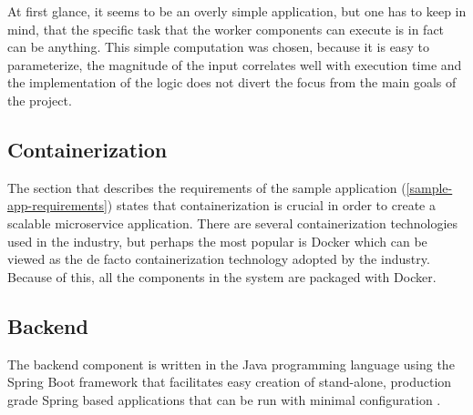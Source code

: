 At first glance, it seems to be an overly simple application, but one has to keep in mind, that the specific task that the worker components can execute is in fact can be anything. This simple computation was chosen, because it is easy to parameterize, the magnitude of the input correlates well with execution time and the implementation of the logic does not divert the focus from the main goals of the project.

\subsection{Containerization}

The section that describes the requirements of the sample application (\ref{sample-app-requirements}) states that containerization is crucial in order to create a scalable microservice application. There are several containerization technologies used in the industry, but perhaps the most popular is Docker \cite{Docker} which can be viewed as the de facto containerization technology adopted by the industry. Because of this, all the components in the system are packaged with Docker.


\subsection{Backend}


The backend component is written in the Java programming language using the Spring Boot framework that facilitates easy creation of stand-alone, production grade Spring based applications that can be run with minimal configuration \cite{SpringBoot}.

